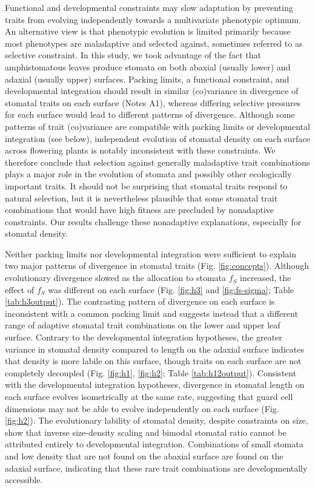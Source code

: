\documentclass[
  12pt,
]{article}
\begin{document}
Functional and developmental constraints may slow adaptation by preventing traits from evolving independently towards a multivariate phenotypic optimum. An alternative view is that phenotypic evolution is limited primarily because most phenotypes are maladaptive and selected against, sometimes referred to as selective constraint. In this study, we took advantage of the fact that amphistomatous leaves produce stomata on both abaxial (usually lower) and adaxial (usually upper) surfaces. Packing limits, a functional constraint, and developmental integration should result in similar (co)variance in divergence of stomatal traits on each surface (Notes A1), whereas differing selective pressures for each surface would lead to different patterns of divergence. Although some patterns of trait (co)variance are compatible with packing limits or developmental integration (see below), independent evolution of stomatal density on each surface across flowering plants is notably inconsistent with these constraints. We therefore conclude that selection against generally maladaptive trait combinations plays a major role in the evolution of stomata and possibly other ecologically important traits. It should not be surprising that stomatal traits respond to natural selection, but it is nevertheless plausible that some stomatal trait combinations that would have high fitness are precluded by nonadaptive constraints. Our results challenge these nonadaptive explanations, especially for stomatal density.

Neither packing limits nor developmental integration were sufficient to explain two major patterns of divergence in stomatal traits (Fig. \ref{fig:concepts}). Although evolutionary divergence slowed as the allocation to stomata \(f_S\) increased, the effect of \(f_S\) was different on each surface (Fig. \ref{fig:h3} and \ref{fig:fs-sigma}; Table \ref{tab:h3output}). The contrasting pattern of divergence on each surface is inconsistent with a common packing limit and suggests instead that a different range of adaptive stomatal trait combinations on the lower and upper leaf surface. Contrary to the developmental integration hypotheses, the greater variance in stomatal density compared to length on the adaxial surface indicates that density is more labile on this surface, though traits on each surface are not completely decoupled (Fig. \ref{fig:h1}, \ref{fig:h2}; Table \ref{tab:h12output}). Consistent with the developmental integration hypotheses, divergence in stomatal length on each surface evolves isometrically at the same rate, suggesting that guard cell dimensions may not be able to evolve independently on each surface (Fig. \ref{fig:h2}). The evolutionary lability of stomatal density, despite constraints on size, show that inverse size-density scaling and bimodal stomatal ratio cannot be attributed entirely to developmental integration. Combinations of small stomata and low density that are not found on the abaxial surface are found on the adaxial surface, indicating that these rare trait combinations are developmentally accessible.
\end{document}
